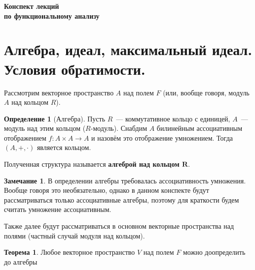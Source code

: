 \documentclass[12pt]{extarticle}
\theoremstyle{definition}
\newtheorem{theorem}{\indent Теорема}[section]
\newtheorem{definition}{\indent Определение}[section]
\newtheorem*{remark}{\indent Замечание}
\begin{document}
    \begin{titlepage}
        \null
        \vfill
        \centering\Huge\bfseries Конспект лекций\\по функциональному анализу
        \vfill
        \null
    \end{titlepage}
    \setcounter{page}{2}
    \tableofcontents
    \newpage
    \section[Алгебры, идеалы, условия обратимости.]{Алгебра, идеал, максимальный идеал.\\Условия обратимости.}
    Рассмотрим векторное пространство $A$ над полем $F$ (или, вообще говоря, модуль $A$ над кольцом $R$).
    \begin{definition}[Алгебра]\label{def:Algebra}
        Пусть $R$~--- коммутативное кольцо с единицей, $A$~--- модуль над этим кольцом ($R$-модуль). Снабдим $A$ билинейным ассоциативным отображением $f\colon A\times A\to A$ и назовём это отображение умножением. Тогда $(A, +, \cdot)$ является кольцом.

        Полученная структура называется \textbf{алгеброй над кольцом $\symbf R$}.
    \end{definition}
    \begin{remark}
        В определении алгебры требовалась ассоциативность умножения. Вообще говоря это необязательно, однако в данном конспекте будут рассматриваться только ассоциативные алгебры, поэтому для краткости будем считать умножение ассоциативным.

        Также далее будут рассматриваться в основном векторные пространства над полями (частный случай модуля над кольцом).
    \end{remark}
    \begin{theorem}\label{th:Constructing algebra}
        Любое векторное пространство $V$ над полем $F$ можно доопределить до алгебры
    \end{theorem}
\end{document}
